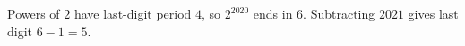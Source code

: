 Powers of $2$ have last-digit period $4$, so $2^{2020}$ ends in $6$. Subtracting $2021$ gives last digit $6-1=\boxed5$.
